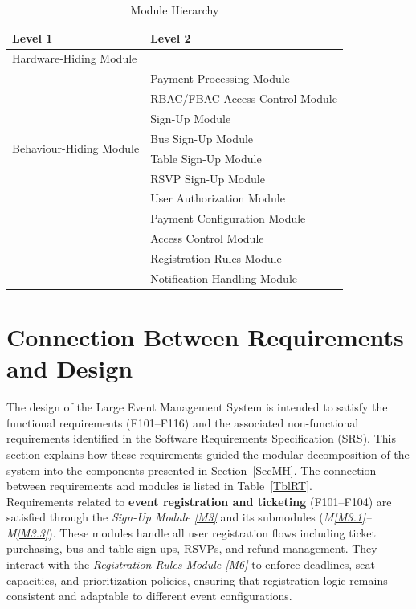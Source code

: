 \documentclass[12pt, titlepage]{article}
\newcommand{\mref}[1]{M\ref{#1}}
\begin{document}
\begin{table}[H]
\centering
\begin{tabular}{p{} p{}}
\toprule
\textbf{Level 1} & \textbf{Level 2}\\
\midrule

{Hardware-Hiding Module} & ~ \\
\midrule

\multirow{8}{0.3\textwidth}{Behaviour-Hiding Module} 
& Payment Processing Module\\
& RBAC/FBAC Access Control Module\\
& Sign-Up Module\\
& \hspace{1em} Bus Sign-Up Module\\
& \hspace{1em} Table Sign-Up Module\\
& \hspace{1em} RSVP Sign-Up Module\\
& User Authorization Module\\
\midrule

\multirow{4}{0.3\textwidth}{Software Decision Module}
& Payment Configuration Module\\
& Access Control Module\\
& Registration Rules Module\\
& Notification Handling Module\\
\bottomrule
\end{tabular}
\caption{Module Hierarchy}
\label{TblMH}
\end{table}


\section{Connection Between Requirements and Design} \label{SecConnection}

The design of the Large Event Management System is intended to satisfy the functional
requirements (F101–F116) and the associated non-functional requirements identified in the
Software Requirements Specification (SRS). This section explains how these requirements
guided the modular decomposition of the system into the components presented in
Section~\ref{SecMH}. The connection between requirements and modules is listed in Table~\ref{TblRT}.\\

\noindent
Requirements related to \textbf{event registration and ticketing} (F101–F104) are
satisfied through the \textit{Sign-Up Module \ref{M3}} and its submodules
(\textit{\mref{M3.1}–\mref{M3.3}}). These modules handle all user registration flows including ticket
purchasing, bus and table sign-ups, RSVPs, and refund management. They interact with the
\textit{Registration Rules Module \ref{M6}} to enforce deadlines, seat capacities, and
prioritization policies, ensuring that registration logic remains consistent and adaptable
to different event configurations. \\
\end{document}
